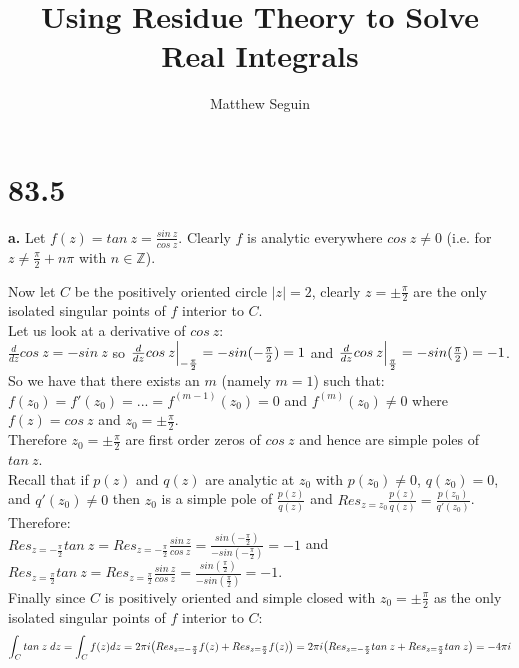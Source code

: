 \documentclass{article}
\title{Using Residue Theory to Solve Real Integrals}
\author{Matthew Seguin}
\date{}
\begin{document}
\maketitle

\section*{83.5}

{\Large\textbf{a.}} Let $f(z) = tan\:z =\frac{sin\:z}{cos\:z}$. Clearly $f$ is analytic everywhere $cos\:z\neq 0$ (i.e. for $z\neq\frac{\pi}{2} + n\pi$ with $n\in\mathbb{Z}$).
\begin{center}
    \doublespacing
    Now let $C$ be the positively oriented circle $|z| = 2$, clearly $z =\pm\frac{\pi}{2}$ are the only isolated singular points of $f$ interior to $C$.
    \\Let us look at a derivative of $cos\:z$:
    \\$\frac{d}{dz} cos\:z = -sin\:z$ so $\frac{d}{dz} cos\:z\Big{|}_{-\frac{\pi}{2}} = -sin(-\frac{\pi}{2}) = 1$ and $\frac{d}{dz} cos\:z\Big{|}_{\frac{\pi}{2}} = -sin(\frac{\pi}{2}) = -1$.
    \\So we have that there exists an $m$ (namely $m=1$) such that:
    \\$f(z_0) = f'(z_0) = ... = f^{(m-1)} (z_0) = 0$ and $f^{(m)} (z_0)\neq 0$ where $f(z) = cos\:z$ and $z_0 =\pm\frac{\pi}{2}$.
    \\Therefore $z_0 =\pm\frac{\pi}{2}$ are first order zeros of $cos\:z$ and hence are simple poles of $tan\:z$.
    \break
    \\Recall that if $p(z)$ and $q(z)$ are analytic at $z_0$ with $p(z_0)\neq 0$, $q(z_0) = 0$, and $q'(z_0)\neq 0$ then $z_0$ is a simple pole of $\frac{p(z)}{q(z)}$ and $Res_{z=z_0}\frac{p(z)}{q(z)} =\frac{p(z_0)}{q'(z_0)}$.
    \\Therefore:
    \\$Res_{z=-\frac{\pi}{2}} tan\:z = Res_{z=-\frac{\pi}{2}}\frac{sin\:z}{cos\:z} =\frac{sin(-\frac{\pi}{2})}{-sin(-\frac{\pi}{2})} = -1$ and $Res_{z=\frac{\pi}{2}} tan\:z = Res_{z=\frac{\pi}{2}}\frac{sin\:z}{cos\:z} =\frac{sin(\frac{\pi}{2})}{-sin(\frac{\pi}{2})} = -1$.
    \\Finally since $C$ is positively oriented and simple closed with $z_0 =\pm\frac{\pi}{2}$ as the only isolated singular points of $f$ interior to $C$:
    \[\int _C tan\:z\;dz =\int _C f(z) dz = 2\pi i\big{(}Res_{z=-\frac{\pi}{2}} f(z) + Res_{z=\frac{\pi}{2}} f(z)\big{)} = 2\pi i\big{(}Res_{z=-\frac{\pi}{2}} tan\:z + Res_{z=\frac{\pi}{2}} tan\:z\big{)} = -4\pi i\]
    \qedsymbol
\end{center}
\end{document}
